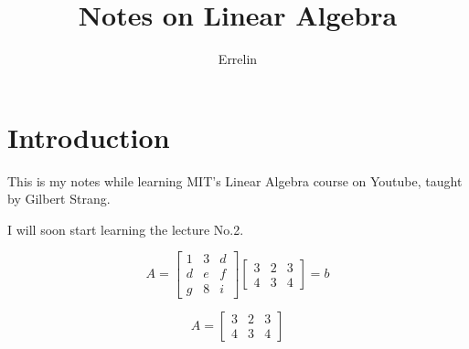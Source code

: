 \documentclass[a4paper, 11pt]{article}
\author{Errelin}
\title{Notes on Linear Algebra}
\begin{document}
	\maketitle
	\section{Introduction}
	This is my notes while learning MIT's Linear Algebra course on Youtube, taught by Gilbert Strang.

	I will soon start learning the lecture No.2.

	\begin{equation*}
		A = 
		\begin{bmatrix}
			1 & 3 & d \\
			d & e & f \\
			g & 8 & i
		\end{bmatrix}
		\begin{bmatrix}
			3 & 2 & 3 \\
  	  4 & 3 & 4 
		\end{bmatrix}
		= b
	\end{equation*}

\begin{equation}
	A = 
  \begin{bmatrix}
  	3 & 2 & 3 \\
  	4 & 3 & 4 
  \end{bmatrix}
\end{equation}
\end{document}

